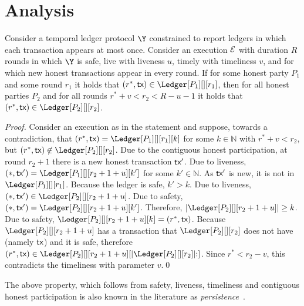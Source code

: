 \section{Analysis}

\begin{lemma}
  Consider a temporal ledger protocol $\Y$
  constrained to report ledgers in which each transaction appears at most once.
  Consider an execution $\mathcal{E}$ with duration $R$ rounds in which $\Y$ is
  safe, live with liveness $u$, timely with timeliness $v$, and for which
  new honest transactions appear in every round.
  If for some honest party $P_1$ and some round $r_1$ it holds that
  $(r^*, \tx) \in \Ledger[P_1][][r_1]$, then
  for all honest parties $P_2$ and for all rounds $r^* + v < r_2 < R - u - 1$
  it holds that
  $(r^*, \tx) \in \Ledger[P_2][][r_2]$.
\end{lemma}
\begin{proof}
  Consider an execution as in the statement and suppose, towards a contradiction,
  that $(r^*, \tx) = \Ledger[P_1][][r_1][k]$ for some $k \in \mathbb{N}$
  with $r^* + v < r_2$, but
  $(r^*, \tx) \not\in \Ledger[P_2][][r_2]$.
  Due to the contiguous honest participation, at round $r_2 + 1$ there is
  a new honest transaction $\textsf{tx}'$. Due to liveness,
  $(*, \tx') = \Ledger[P_1][][r_2 + 1 + u][k']$ for some $k' \in \mathbb{N}$.
  As $\textsf{tx}'$ is new, it is not in $\Ledger[P_1][][r_1]$.
  Because the ledger is safe, $k' > k$.
  Due to liveness, $(*, \tx') \in \Ledger[P_2][][r_2 + 1 + u]$.
  Due to safety, $(*, \tx') = \Ledger[P_2][][r_2 + 1 + u][k']$.
  Therefore, $|\Ledger[P_2][][r_2 + 1 + u]| \geq k$.
  Due to safety, $\Ledger[P_2][][r_2 + 1 + u][k] = (r^*, \tx)$.
  Because $\Ledger[P_2][][r_2 + 1 + u]$ has a transaction
  that $\Ledger[P_2][][r_2]$ does not have (namely $\textsf{tx}$)
  and it is safe, therefore
  $(r^*, \tx) \in \Ledger[P_2][][r_2 + 1 + u][|\Ledger[P_2][][r_2]|{:}]$.
  Since $r^* < r_2 - v$, this contradicts the timeliness with parameter $v$.\qed
\end{proof}

The above property, which follows from safety, liveness, timeliness and
contiguous honest participation is also known in the literature as
\emph{persistence}~\cite{backbone}.

%
%

